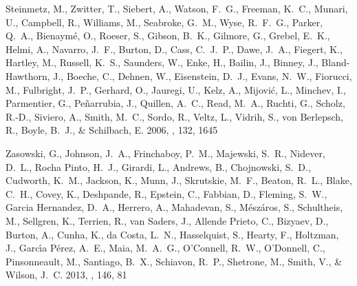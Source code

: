 \documentclass[12pt, preprint]{aastex}
\begin{document}
\begin{thebibliography}{24}
{Steinmetz}, M., {Zwitter}, T., {Siebert}, A., {Watson}, F.~G., {Freeman},
  K.~C., {Munari}, U., {Campbell}, R., {Williams}, M., {Seabroke}, G.~M.,
  {Wyse}, R.~F.~G., {Parker}, Q.~A., {Bienaym{\'e}}, O., {Roeser}, S.,
  {Gibson}, B.~K., {Gilmore}, G., {Grebel}, E.~K., {Helmi}, A., {Navarro},
  J.~F., {Burton}, D., {Cass}, C.~J.~P., {Dawe}, J.~A., {Fiegert}, K.,
  {Hartley}, M., {Russell}, K.~S., {Saunders}, W., {Enke}, H., {Bailin}, J.,
  {Binney}, J., {Bland-Hawthorn}, J., {Boeche}, C., {Dehnen}, W., {Eisenstein},
  D.~J., {Evans}, N.~W., {Fiorucci}, M., {Fulbright}, J.~P., {Gerhard}, O.,
  {Jauregi}, U., {Kelz}, A., {Mijovi{\'c}}, L., {Minchev}, I., {Parmentier},
  G., {Pe{\~n}arrubia}, J., {Quillen}, A.~C., {Read}, M.~A., {Ruchti}, G.,
  {Scholz}, R.-D., {Siviero}, A., {Smith}, M.~C., {Sordo}, R., {Veltz}, L.,
  {Vidrih}, S., {von Berlepsch}, R., {Boyle}, B.~J., \& {Schilbach}, E. 2006,
  \aj, 132, 1645

{Zasowski}, G., {Johnson}, J.~A., {Frinchaboy}, P.~M., {Majewski}, S.~R.,
  {Nidever}, D.~L., {Rocha Pinto}, H.~J., {Girardi}, L., {Andrews}, B.,
  {Chojnowski}, S.~D., {Cudworth}, K.~M., {Jackson}, K., {Munn}, J.,
  {Skrutskie}, M.~F., {Beaton}, R.~L., {Blake}, C.~H., {Covey}, K.,
  {Deshpande}, R., {Epstein}, C., {Fabbian}, D., {Fleming}, S.~W., {Garcia
  Hernandez}, D.~A., {Herrero}, A., {Mahadevan}, S., {M{\'e}sz{\'a}ros}, S.,
  {Schultheis}, M., {Sellgren}, K., {Terrien}, R., {van Saders}, J., {Allende
  Prieto}, C., {Bizyaev}, D., {Burton}, A., {Cunha}, K., {da Costa}, L.~N.,
  {Hasselquist}, S., {Hearty}, F., {Holtzman}, J., {Garc{\'{\i}}a P{\'e}rez},
  A.~E., {Maia}, M.~A.~G., {O'Connell}, R.~W., {O'Donnell}, C., {Pinsonneault},
  M., {Santiago}, B.~X., {Schiavon}, R.~P., {Shetrone}, M., {Smith}, V., \&
  {Wilson}, J.~C. 2013, \aj, 146, 81

\end{thebibliography}

%
\end{document}
